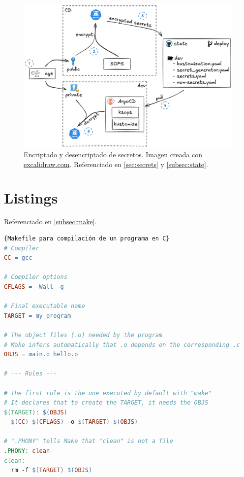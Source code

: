 \begin{figure}[h]
  \centerline{\includegraphics[width=13.5cm]{figuras/secrets}}
  \caption{Encriptado y desencriptado de secretos. Imagen creada con \href{https://excalidraw.com}{excalidraw.com}. Referenciado en \ref{sec:secrets} y \ref{subsec:state}.}
  \label{fig:secrets}
\end{figure}

\clearpage

\section{Listings}

Referenciado en \ref{subsec:make}.

\begin{lstlisting}[language=make,label=lst:make]{Makefile para compilación de un programa en C}
# Compiler
CC = gcc

# Compiler options
CFLAGS = -Wall -g

# Final executable name
TARGET = my_program

# The object files (.o) needed by the program
# Make infers automatically that .o depends on the corresponding .c
OBJS = main.o hello.o

# --- Rules ---

# The first rule is the one executed by default with "make"
# It declares that to create the TARGET, it needs the OBJS
$(TARGET): $(OBJS)
  $(CC) $(CFLAGS) -o $(TARGET) $(OBJS)

# ".PHONY" tells Make that "clean" is not a file
.PHONY: clean
clean:
  rm -f $(TARGET) $(OBJS)
\end{lstlisting}


